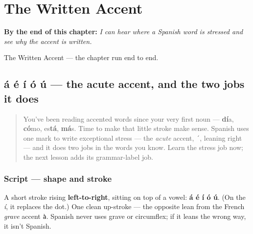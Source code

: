
\chapter{The Written Accent}
\label{ch:written-accent}

\begin{chapteropening}
\textbf{By the end of this chapter:} \emph{I can hear where a Spanish word is stressed and see why the accent is written.}

The Written Accent — the chapter run end to end.
\end{chapteropening}

\section[á é í ó ú]{á é í ó ú — the acute accent, and the two jobs it does}

\label{lesson:ES-W01-acento}



\begin{quote}
You've been reading accented words since your very first noun — \textbf{dí}a, \textbf{có}mo, es\textbf{tá}, \textbf{má}s. Time to make that little stroke make sense. Spanish uses one mark to write exceptional stress — the \emph{acute} accent, \texttt{´}, leaning right — and it does two jobs in the words you know. Learn the stress job now; the next lesson adds its grammar-label job.
\end{quote}

\subsection*{Script — shape and stroke}

A short stroke rising \textbf{left-to-right}, sitting on top of a vowel: \textbf{á é í ó ú}. (On the \emph{í}, it replaces the dot.) One clean up-stroke — the opposite lean from the French \emph{grave} accent \texttt{à}. Spanish never uses grave or circumflex; if it leans the wrong way, it isn't Spanish.

